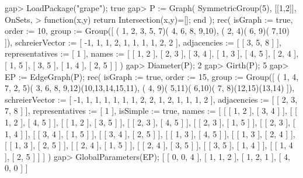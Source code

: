 \beginexample
gap> LoadPackage("grape");
true
gap> P := Graph( SymmetricGroup(5), [[1,2]], OnSets,
>             function(x,y) return Intersection(x,y)=[]; end );
rec( isGraph := true, order := 10, 
  group := Group([ ( 1, 2, 3, 5, 7)( 4, 6, 8, 9,10), ( 2, 4)( 6, 9)( 7,10) ]),
  schreierVector := [ -1, 1, 1, 2, 1, 1, 1, 1, 2, 2 ], 
  adjacencies := [ [ 3, 5, 8 ] ], representatives := [ 1 ], 
  names := [ [ 1, 2 ], [ 2, 3 ], [ 3, 4 ], [ 1, 3 ], [ 4, 5 ], [ 2, 4 ], 
      [ 1, 5 ], [ 3, 5 ], [ 1, 4 ], [ 2, 5 ] ] )
gap> Diameter(P);
2
gap> Girth(P);
5
gap> EP := EdgeGraph(P);
rec( isGraph := true, order := 15, 
  group := Group([ ( 1, 4, 7, 2, 5)( 3, 6, 8, 9,12)(10,13,14,15,11), 
      ( 4, 9)( 5,11)( 6,10)( 7, 8)(12,15)(13,14) ]), 
  schreierVector := [ -1, 1, 1, 1, 1, 1, 1, 2, 2, 1, 2, 1, 1, 1, 2 ], 
  adjacencies := [ [ 2, 3, 7, 8 ] ], representatives := [ 1 ], 
  isSimple := true, 
  names := [ [ [ 1, 2 ], [ 3, 4 ] ], [ [ 1, 2 ], [ 4, 5 ] ], 
      [ [ 1, 2 ], [ 3, 5 ] ], [ [ 2, 3 ], [ 4, 5 ] ], [ [ 2, 3 ], [ 1, 5 ] ], 
      [ [ 2, 3 ], [ 1, 4 ] ], [ [ 3, 4 ], [ 1, 5 ] ], [ [ 3, 4 ], [ 2, 5 ] ], 
      [ [ 1, 3 ], [ 4, 5 ] ], [ [ 1, 3 ], [ 2, 4 ] ], [ [ 1, 3 ], [ 2, 5 ] ], 
      [ [ 2, 4 ], [ 1, 5 ] ], [ [ 2, 4 ], [ 3, 5 ] ], [ [ 3, 5 ], [ 1, 4 ] ], 
      [ [ 1, 4 ], [ 2, 5 ] ] ] )
gap> GlobalParameters(EP);
[ [ 0, 0, 4 ], [ 1, 1, 2 ], [ 1, 2, 1 ], [ 4, 0, 0 ] ]
\endexample
